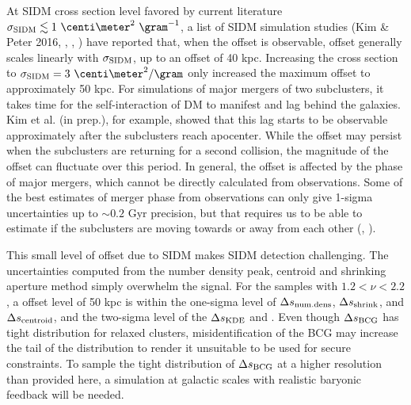 At SIDM cross section level favored by current literature $\sigmaSIDM
\lesssim 1~\centi\meter^2 ~\gram^{-1}$, a list of SIDM simulation studies (Kim \&
Peter 2016, \citealt{Robertson2016}, \citealt{Kahlhoefer14}, \citealt{Randall2008d})
have reported that, when the offset is observable, 
offset generally scales linearly with $\sigma_{\rm SIDM}$,  
up to an offset of 40 kpc.  Increasing the cross section to $\sigmaSIDM = 3
~\centi\meter^2 / \gram$ only increased the maximum offset to approximately 50 kpc.
For simulations of major mergers of two subclusters, it takes time for the self-interaction of DM
to manifest and lag behind the galaxies. Kim et al. (in prep.), for example, showed that
this lag starts to be observable approximately after the subclusters reach apocenter. 
While the offset may persist when the subclusters are returning for a
second collision, the magnitude of the offset can fluctuate over this period.
In general, the offset is affected by the phase of major mergers, which cannot be
directly calculated from observations. Some of the best estimates of merger
phase from observations
can only give 1-sigma uncertainties up
to $\sim 0.2$ Gyr precision, but that requires us to be able to estimate if the
subclusters are moving towards or away from each other (\citealt{D13}, \citealt{Ng2014}).

This small level of offset due to SIDM makes SIDM detection challenging. 
The uncertainties computed from the number density peak, centroid and shrinking
aperture method simply overwhelm the signal. 
For the samples with $1.2 < \nu < 2.2$, 
a offset level of 50 kpc is within the one-sigma level of $\Delta s_{\rm num.
dens}$, $\Delta s_{\rm shrink}$, and $\Delta s_{\rm centroid}$, and the two-sigma
level of the $\Delta s_{\rm KDE}$ and . 
Even though $\Delta s_{\rm BCG}$ has tight distribution for relaxed clusters, misidentification of the BCG 
may increase the tail of the distribution to render it unsuitable to be used 
for secure constraints. To sample the tight distribution of $\Delta s_{\rm
BCG}$ at a higher
resolution than provided here, a simulation at galactic scales with realistic
baryonic feedback will be needed. 

